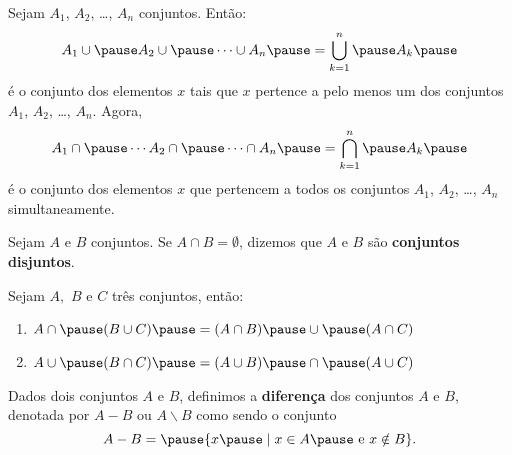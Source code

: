 \documentclass{beamer}
\begin{document}
    \begin{frame}
        \begin{definicao}
            Sejam $A_{1}$, \pause $A_2$, \pause \dots, $A_{n}$ \pause conjuntos. \pause Então:\pause
            \[
                A_{1} \cup \pause A_{2} \cup \pause \cdots \cup A_{n} \pause = \displaystyle\bigcup_{k=1}^n \pause A_{k}\pause
            \]
            é o conjunto dos elementos $x$ \pause tais que $x$ pertence a \pause pelo menos um \pause dos conjuntos $A_{1}$, \pause $A_2$, \pause \dots, $A_{n}$. \pause Agora,\pause
            \[
                A_{1} \cap \pause \cdots A_2 \cap \pause \cdots \cap A_{n} \pause = \displaystyle\bigcap_{k=1}^{n} \pause A_{k}\pause
            \]
            é o conjunto dos elementos $x$ \pause que pertencem a todos \pause os conjuntos $A_{1}$, \pause $A_2$, \pause \dots, $A_{n}$ \pause simultaneamente.
        \end{definicao}
    \end{frame}

    \begin{frame}
        \begin{definicao}
            Sejam $A$ e $B$ conjuntos. \pause Se $A \cap B = \emptyset$, \pause dizemos que $A$ e $B$ são \pause \textbf{conjuntos disjuntos}.
        \end{definicao}
    \end{frame}

    \begin{frame}
        \begin{proposicao} Sejam $A,$ $B$ e $C$ três conjuntos, \pause então:\pause
            \begin{enumerate}[label={\roman*})]
                \item $A \cap \pause ( B \cup C) \pause = (A \cap B) \pause \cup \pause (A \cap C)$\pause
                \item $A \cup \pause (B \cap C) \pause = (A \cup B) \pause \cap \pause (A \cup C)$\pause
            \end{enumerate}
        \end{proposicao}
    \end{frame}

    \begin{frame}
        \begin{definicao}
            Dados dois conjuntos $A$ e $B$, \pause definimos a \textbf{diferença} \pause dos conjuntos $A$ e $B$, denotada por \pause $A - B$ ou $A \backslash B$ \pause como sendo o conjunto\pause
            \[
                A - B = \pause \{x \pause \mid x \in A \pause \mbox{ e } x \notin B\}.
            \]
        \end{definicao}

    \end{frame}
\end{document}
